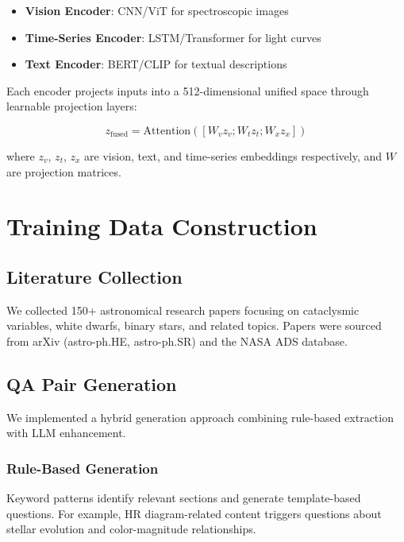 \documentclass[11pt,a4paper]{article}
\begin{document}
\begin{itemize}
    \item \textbf{Vision Encoder}: CNN/ViT for spectroscopic images
    \item \textbf{Time-Series Encoder}: LSTM/Transformer for light curves
    \item \textbf{Text Encoder}: BERT/CLIP for textual descriptions
\end{itemize}

Each encoder projects inputs into a 512-dimensional unified space through learnable projection layers:

\begin{equation}
    z_{\text{fused}} = \text{Attention}([W_v z_v; W_t z_t; W_x z_x])
\end{equation}

where $z_v$, $z_t$, $z_x$ are vision, text, and time-series embeddings respectively, and $W$ are projection matrices.

\section{Training Data Construction}\label{sec:data}

\subsection{Literature Collection}

We collected 150+ astronomical research papers focusing on cataclysmic variables, white dwarfs, binary stars, and related topics. Papers were sourced from arXiv (astro-ph.HE, astro-ph.SR) and the NASA ADS database.

\subsection{QA Pair Generation}

We implemented a hybrid generation approach combining rule-based extraction with LLM enhancement.

\subsubsection{Rule-Based Generation}

Keyword patterns identify relevant sections and generate template-based questions. For example, HR diagram-related content triggers questions about stellar evolution and color-magnitude relationships.
\end{document}
